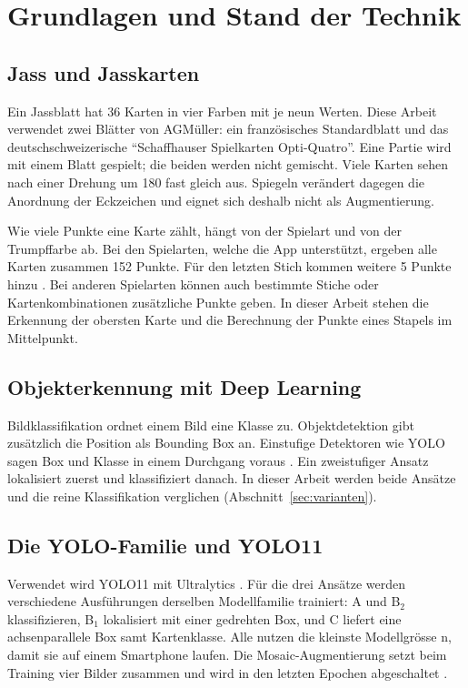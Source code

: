 \section{Grundlagen und Stand der Technik}\label{sec:grundlagen}

\subsection{Jass und Jasskarten}\label{sec:jass}

Ein Jassblatt hat 36 Karten in vier Farben mit je neun Werten.
Diese Arbeit verwendet zwei Blätter von AGMüller: ein französisches
Standardblatt und das deutschschweizerische \enquote{Schaffhauser
Spielkarten Opti-Quatro}. Eine Partie wird mit einem Blatt gespielt; die
beiden werden nicht gemischt. Viele Karten sehen nach einer Drehung um
180\textdegree{} fast gleich aus. Spiegeln verändert dagegen die Anordnung
der Eckzeichen und eignet sich deshalb nicht als Augmentierung.

Wie viele Punkte eine Karte zählt, hängt von der Spielart und von der
Trumpffarbe ab. Bei den Spielarten, welche die App unterstützt, ergeben
alle Karten zusammen 152 Punkte. Für den letzten Stich kommen weitere
5 Punkte hinzu \cite{swisslos2026grundlagen}. Bei anderen Spielarten
können auch bestimmte Stiche oder Kartenkombinationen zusätzliche Punkte
geben. In dieser Arbeit stehen die Erkennung der obersten Karte und die
Berechnung der Punkte eines Stapels im Mittelpunkt.

\subsection{Objekterkennung mit Deep Learning}\label{sec:objekterkennung}

Bildklassifikation ordnet einem Bild eine Klasse zu. Objektdetektion gibt
zusätzlich die Position als Bounding Box an. Einstufige Detektoren wie YOLO
sagen Box und Klasse in einem Durchgang voraus \cite{redmon2016yolo}. Ein
zweistufiger Ansatz lokalisiert zuerst und klassifiziert danach. In dieser
Arbeit werden beide Ansätze und die reine Klassifikation verglichen
(Abschnitt~\ref{sec:varianten}).

\subsection{Die YOLO-Familie und YOLO11}\label{sec:yolo}

Verwendet wird YOLO11 mit Ultralytics \cite{jocher2024ultralytics,
ultralytics2025yolo11docs,khanam2024yolov11}. Für die drei Ansätze werden verschiedene
Ausführungen derselben Modellfamilie trainiert: A und B$_2$ klassifizieren,
B$_1$ lokalisiert mit einer gedrehten Box, und C liefert eine
achsenparallele Box samt Kartenklasse. Alle nutzen die kleinste
Modellgrösse n, damit sie auf einem Smartphone laufen. Die
Mosaic-Augmentierung setzt beim Training vier Bilder zusammen und wird
in den letzten Epochen abgeschaltet \cite{bochkovskiy2020yolov4,ultralytics2025augment}.

